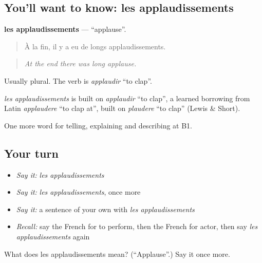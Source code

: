 \subsection*{You'll want to know: les applaudissements}
\textbf{les applaudissements} — \textquotedblleft{}applause\textquotedblright{}.

\begin{quote}
À la fin, il y a eu de longs applaudissements.
\end{quote}

\begin{quote}
\emph{At the end there was long applause.}
\end{quote}

Usually plural. The verb is \emph{applaudir} \textquotedblleft{}to clap\textquotedblright{}.

\begin{cousinweb}
\emph{les applaudissements} is built on \emph{applaudir} \textquotedblleft{}to clap\textquotedblright{}, a learned borrowing from Latin \emph{applaudere} \textquotedblleft{}to clap at\textquotedblright{}, built on \emph{plaudere} \textquotedblleft{}to clap\textquotedblright{} (Lewis \& Short).
\end{cousinweb}

\begin{grammarlens}[title={What you've built}]
One more word for telling, explaining and describing at B1.
\end{grammarlens}

\subsection*{Your turn}
\begin{itemize}
\raggedright
  \item \emph{Say it:} \emph{les applaudissements}
  \item \emph{Say it:} \emph{les applaudissements}, once more
  \item \emph{Say it:} a sentence of your own with \emph{les applaudissements}
  \item \emph{Recall:} say the French for to perform, then the French for actor, then say \emph{les applaudissements} again
\end{itemize}

\begin{tcolorbox}[breakable,colback=teal!4,colframe=teal!35!black,title={Before you move on}]
What does les applaudissements mean? (\textquotedblleft{}Applause\textquotedblright{}.) Say it once more.
\end{tcolorbox}
